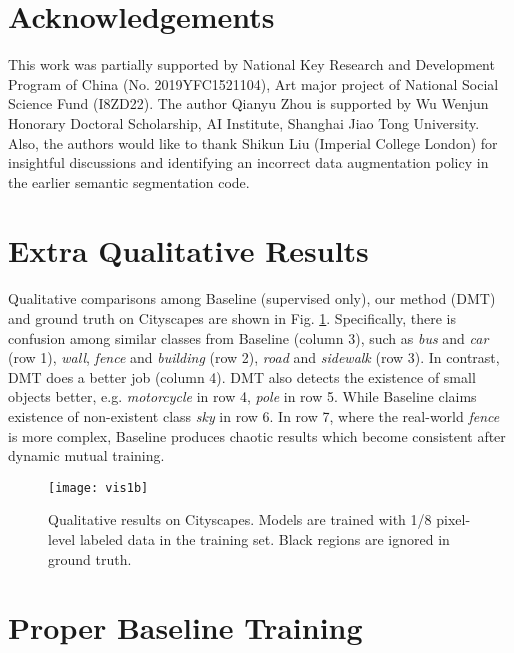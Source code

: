 \documentclass[preprint,review,10pt]{elsarticle}
\begin{document}
\section{Acknowledgements}

This work was partially supported by National Key Research and Development Program of China (No. 2019YFC1521104), Art major project of National Social Science Fund (I8ZD22). The author Qianyu Zhou is supported by Wu Wenjun Honorary Doctoral Scholarship, AI Institute, Shanghai Jiao Tong University. Also, the authors would like to thank Shikun Liu (Imperial College London) for insightful discussions and identifying an incorrect data augmentation policy in the earlier semantic segmentation code.




\clearpage
\appendix

\section{Extra Qualitative Results}

Qualitative comparisons among Baseline (supervised only), our method (DMT) and ground truth on Cityscapes are shown in Fig. \ref{fig11}. Specifically, there is confusion among similar classes from Baseline (column 3), such as \textit{bus} and \textit{car} (row 1), \textit{wall}, \textit{fence} and \textit{building} (row 2), \textit{road} and \textit{sidewalk} (row 3). In contrast, DMT does a better job (column 4). DMT also detects the existence of small objects better, e.g. \textit{motorcycle} in row 4, \textit{pole} in row 5. While Baseline claims existence of non-existent class \textit{sky} in row 6. In row 7, where the real-world \textit{fence} is more complex, Baseline produces chaotic results which become consistent after dynamic mutual training.

\begin{figure}[t]
\centering
\texttt{[image: vis1b]}
\caption{Qualitative results on Cityscapes. Models are trained with 1/8 pixel-level labeled data in the training set. Black regions are ignored in ground truth. }
\label{fig11}
\end{figure}

\section{Proper Baseline Training}
\label{sec:a3}
\end{document}
